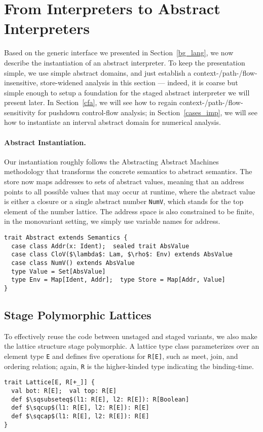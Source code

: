 \section{From Interpreters to Abstract Interpreters} \label{unstaged_abs}

Based on the generic interface we presented in Section~\ref{bg_lang}, 
we now describe the instantiation of an abstract interpreter.
To keep the presentation simple, we use simple abstract domains, and just establish a 
context-/path-/flow-insensitive, store-widened analysis in this section --- indeed, it is coarse
but simple enough to setup a foundation for the staged abstract interpreter we will present later.
In Section~\ref{cfa}, we will see how to regain context-/path-/flow-sensitivity 
for pushdown control-flow analysis; in Section~\ref{cases_imp}, we will see how to instantiate 
an interval abstract domain for numerical analysis.

\paragraph{Abstract Instantiation.}
Our instantiation roughly follows the Abstracting Abstract Machines methodology 
\cite{DBLP:conf/icfp/HornM10, DBLP:journals/jfp/HornM12} that transforms the concrete semantics 
to abstract semantics. The store now maps addresses to sets of abstract values, meaning that an address points
to all possible values that may occur at runtime, where the abstract value is either a closure or 
a single abstract number \texttt{NumV}, which stands for the top element of the number lattice. 
The address space is also constrained to be finite, in the monovariant setting, we simply use variable names 
for address.

\begin{lstlisting}
trait Abstract extends Semantics {
  case class Addr(x: Ident);  sealed trait AbsValue
  case class CloV($\lambda$: Lam, $\rho$: Env) extends AbsValue
  case class NumV() extends AbsValue
  type Value = Set[AbsValue]
  type Env = Map[Ident, Addr];  type Store = Map[Addr, Value]
}
\end{lstlisting}

\subsection{Stage Polymorphic Lattices} \label{stagedpoly_lat}
To effectively reuse the code between unstaged and staged variants, we also make the lattice structure
stage polymorphic. A lattice type class parameterizes over an element type \texttt{E} and defines
five operations for \texttt{R[E]}, such as meet, join, and ordering relation; again, \texttt{R} 
is the higher-kinded type indicating the binding-time.
\begin{lstlisting}
trait Lattice[E, R[+_]] {
  val bot: R[E];  val top: R[E]
  def $\sqsubseteq$(l1: R[E], l2: R[E]): R[Boolean]
  def $\sqcup$(l1: R[E], l2: R[E]): R[E]
  def $\sqcap$(l1: R[E], l2: R[E]): R[E]
}
\end{lstlisting}

